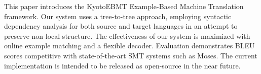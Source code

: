 This paper introduces the KyotoEBMT Example-Based Machine Translation framework. Our system uses a tree-to-tree approach, employing syntactic dependency analysis for both source and target languages in an attempt to preserve non-local structure. The effectiveness of our system is maximized with online example matching and a flexible decoder. Evaluation demonstrates BLEU scores competitive with state-of-the-art SMT systems such as Moses. The current implementation is intended to be released as open-source in the near future.
